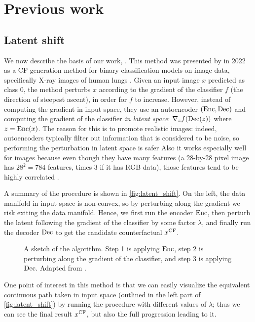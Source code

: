 \documentclass[../main.tex]{subfiles}
\begin{document}
\chapter{Previous work}
\label{ch:previous_work}

\section{Latent shift}

We now describe the basis of our work, \ls{}.
This method was presented by \citeauthor{cohenGifsplanation2022} in 2022 as a CF generation method for binary classification models on image data, specifically X-ray images of human lungs \cite{cohenGifsplanation2022}.
Given an input image $x$ predicted as class 0, the method perturbs $x$ according to the gradient of the classifier $f$ (the direction of steepest ascent), in order for $f$ to increase.
However, instead of computing the gradient in input space, they use an autoencoder $(\operatorname{Enc}, \operatorname{Dec})$ and computing the gradient of the classifier \emph{in latent space}: $\nabla_z f(\operatorname{Dec}(z))$ where $z = \operatorname{Enc}(x)$.
The reason for this is to promote realistic images: indeed, autoencoders typically filter out information that is considered to be noise, so performing the perturbation in latent space is safer 
Also it works especially well for images because even though they have many features (a 28-by-28 pixel image has $28^2 = 784$ features, times 3 if it has RGB data), those features tend to be highly correlated .

A summary of the \ls{} procedure is shown in \autoref{fig:latent_shift}.
On the left, the data manifold in input space is non-convex, so by perturbing along the gradient we risk exiting the data manifold.
Hence, we first run the encoder $\operatorname{Enc}$, then perturb the latent following the gradient of the classifier by some factor $\lambda$, and finally run the decoder $\operatorname{Dec}$ to get the candidate counterfactual $x^\text{CF}$.

\begin{figure}[htbp]
    \centering
    
    \caption{A sketch of the \ls{} algorithm. Step 1 is applying $\operatorname{Enc}$, step 2 is perturbing along the gradient of the classifier, and step 3 is applying $\operatorname{Dec}$. Adapted from \cite{cohenGifsplanation2022}.}
    \label{fig:latent_shift}
\end{figure}

One point of interest in this method is that we can easily visualize the equivalent continuous path taken in input space (outlined in the left part of \autoref{fig:latent_shift}) by running the procedure with different values of $\lambda$; thus we can see the final result $x^\text{CF}$, but also the full progression leading to it.
\end{document}

